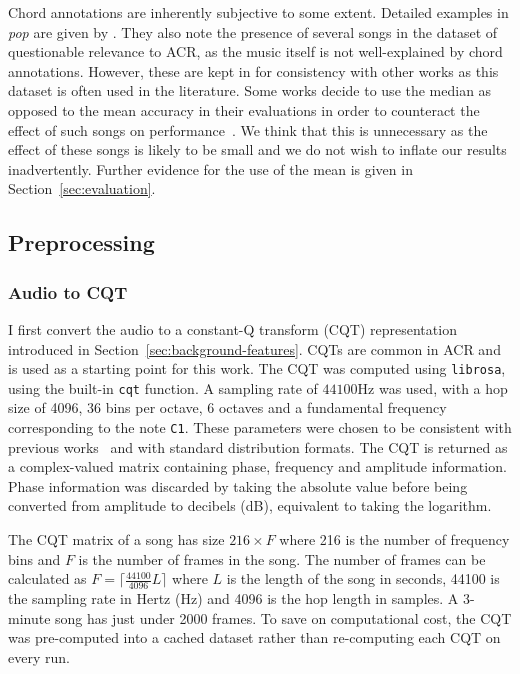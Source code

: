 Chord annotations are inherently subjective to some extent. Detailed examples in \emph{pop} are given by \citet{FourTimelyInsights}. They also note the presence of several songs in the dataset of questionable relevance to ACR, as the music itself is not well-explained by chord annotations. However, these are kept in for consistency with other works as this dataset is often used in the literature. Some works decide to use the median as opposed to the mean accuracy in their evaluations in order to counteract the effect of such songs on performance~\citep{StructuredTraining}. We think that this is unnecessary as the effect of these songs is likely to be small and we do not wish to inflate our results inadvertently. Further evidence for the use of the mean is given in Section~\ref{sec:evaluation}.

\subsection{Preprocessing}

\subsubsection{Audio to CQT}\label{sec:audio-to-cqt}

I first convert the audio to a constant-Q transform (CQT) representation introduced in Section~\ref{sec:background-features}. CQTs are common in ACR and is used as a starting point for this work. The CQT was computed using \texttt{librosa}, using the built-in \texttt{cqt} function. A sampling rate of $44100$Hz was used, with a hop size of 4096, 36 bins per octave, 6 octaves and a fundamental frequency corresponding to the note \texttt{C1}. These parameters were chosen to be consistent with previous works~\citep{StructuredTraining} and with standard distribution formats. The CQT is returned as a complex-valued matrix containing phase, frequency and amplitude information. Phase information was discarded by taking the absolute value before being converted from amplitude to decibels (dB), equivalent to taking the logarithm.

The CQT matrix of a song has size $216 \times F$ where 216 is the number of frequency bins and $F$ is the number of frames in the song. The number of frames can be calculated as $F = \lceil \frac{44100}{4096} L  \rceil$ where $L$ is the length of the song in seconds, 44100 is the sampling rate in Hertz (Hz) and 4096 is the hop length in samples. A 3-minute song has just under 2000 frames. To save on computational cost, the CQT was pre-computed into a cached dataset rather than re-computing each CQT on every run.

